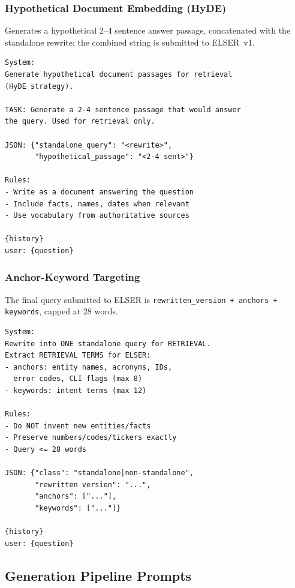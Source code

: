 \subsubsection{Hypothetical Document Embedding (HyDE)}
Generates a hypothetical 2--4 sentence answer passage, concatenated with the standalone rewrite; the combined string is submitted to ELSER~v1.
\begin{verbatim}
System:
Generate hypothetical document passages for retrieval 
(HyDE strategy).

TASK: Generate a 2-4 sentence passage that would answer 
the query. Used for retrieval only.

JSON: {"standalone_query": "<rewrite>",
       "hypothetical_passage": "<2-4 sent>"}

Rules:
- Write as a document answering the question
- Include facts, names, dates when relevant
- Use vocabulary from authoritative sources

{history}
user: {question}
\end{verbatim}

\subsubsection{Anchor-Keyword Targeting}
The final query submitted to ELSER is \texttt{rewritten\_version + anchors + keywords}, capped at $28$ words.
\begin{verbatim}
System:
Rewrite into ONE standalone query for RETRIEVAL.
Extract RETRIEVAL TERMS for ELSER:
- anchors: entity names, acronyms, IDs, 
  error codes, CLI flags (max 8)
- keywords: intent terms (max 12)

Rules:
- Do NOT invent new entities/facts
- Preserve numbers/codes/tickers exactly
- Query <= 28 words

JSON: {"class": "standalone|non-standalone",
       "rewritten version": "...",
       "anchors": ["..."],
       "keywords": ["..."]}

{history}
user: {question}
\end{verbatim}

\subsection{Generation Pipeline Prompts}
\label{subsec:prompt-generation}


